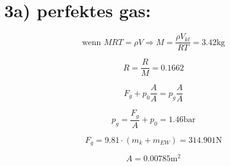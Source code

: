 \section*{3a) perfektes gas:}

\begin{equation*}
\text{wenn } MRT = \rho V \Rightarrow M = \frac{\rho V_{kl}}{RT} = 3.42 \text{kg}
\end{equation*}

\begin{equation*}
R = \frac{R}{M} = 0.1662
\end{equation*}

\begin{equation*}
F_g + p_0 \frac{A}{A} = p_g \frac{A}{A}
\end{equation*}

\begin{equation*}
p_g = \frac{F_g}{A} + p_0 = 1.46 \text{bar}
\end{equation*}

\begin{equation*}
F_g = 9.81 \cdot (m_k + m_{EW}) = 314.901 \text{N}
\end{equation*}

\begin{equation*}
A = 0.00785 \text{m}^2
\end{equation*}